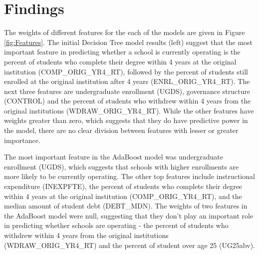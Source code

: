 \documentclass[11pt, letterpaper]{article}
\begin{document}
\section{Findings}
The weights of different features for the each of the models are given in Figure \ref{fig:Features}. The initial Decision Tree model results (left) suggest that the most important feature in predicting whether a school is currently operating is the percent of students who complete their degree within 4 years at the original institution (COMP\_ORIG\_YR4\_RT), followed by the percent of students still enrolled at the original institution after 4 years (ENRL\_ORIG\_YR4\_RT). The next three features are undergraduate enrollment (UGDS), governance structure (CONTROL) and the percent of students who withdrew within 4 years from the original institutions (WDRAW\_ORIG\_YR4\_RT). While the other features have weights greater than zero, which suggests that they do have predictive power in the model, there are no clear division between features with lesser or greater importance.

The most important feature in the AdaBoost model was undergraduate enrollment (UGDS), which suggests that schools with higher enrollments are more likely to be currently operating. The other top features include instructional expenditure (INEXPFTE), the percent of students who complete their degree within 4 years at the original institution (COMP\_ORIG\_YR4\_RT), and the median amount of student debt (DEBT\_MDN).  The weights of two features in the AdaBoost model were null, suggesting that they don't play an important role in predicting whether schools are operating -  the percent of students who withdrew within 4 years from the original institutions (WDRAW\_ORIG\_YR4\_RT) and the percent of student over age 25 (UG25abv).

\end{document}
